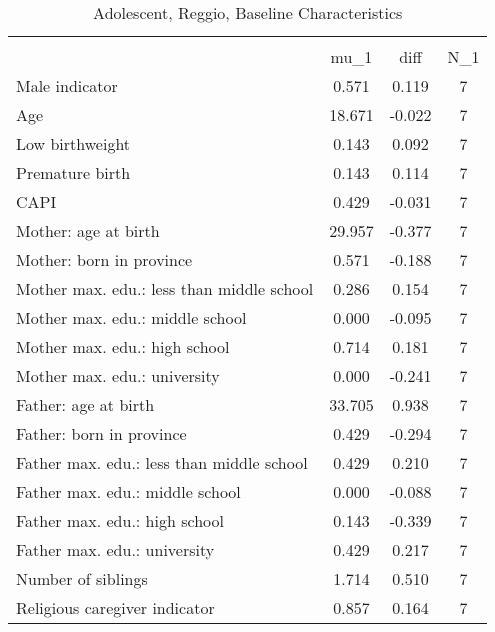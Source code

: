 \begin{table}[htbp]\centering
\def\sym#1{\ifmmode^{#1}\else\(^{#1}\)\fi}
\caption{Adolescent, Reggio, Baseline Characteristics}
\begin{tabular}{l*{1}{ccc}}
\toprule
                    &\multicolumn{3}{c}{}                           \\
                    &        mu\_1         &        diff&         N\_1\\
\midrule
Male indicator      &       0.571         &       0.119&           7\\
Age                 &      18.671         &      -0.022&           7\\
Low birthweight     &       0.143         &       0.092&           7\\
Premature birth     &       0.143         &       0.114&           7\\
CAPI                &       0.429         &      -0.031&           7\\
Mother: age at birth&      29.957         &      -0.377&           7\\
Mother: born in province&       0.571         &      -0.188&           7\\
Mother max. edu.: less than middle school&       0.286         &       0.154&           7\\
Mother max. edu.: middle school&       0.000         &      -0.095&           7\\
Mother max. edu.: high school&       0.714         &       0.181&           7\\
Mother max. edu.: university&       0.000         &      -0.241&           7\\
Father: age at birth&      33.705         &       0.938&           7\\
Father: born in province&       0.429         &      -0.294&           7\\
Father max. edu.: less than middle school&       0.429         &       0.210&           7\\
Father max. edu.: middle school&       0.000         &      -0.088&           7\\
Father max. edu.: high school&       0.143         &      -0.339&           7\\
Father max. edu.: university&       0.429         &       0.217&           7\\
Number of siblings  &       1.714         &       0.510&           7\\
Religious caregiver indicator&       0.857         &       0.164&           7\\

\end{tabular}
\end{table}
